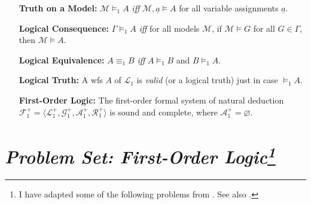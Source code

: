 \documentclass[a4paper, 11pt]{article} %
\newcommand{\tuple}[1]{\langle#1\rangle} %
\newcommand{\M}[0]{\mathcal{M}}
\begin{document}
\begin{enumerate}[leftmargin=1.2in,labelsep=.15in] %
\item[\bf Truth on a Model:] $\M\vDash_1 A$ \textit{iff} $\mathcal{M},\underline{a}\vDash A$ for all variable assignments $\underline{a}$.
\item[\bf Logical Consequence:] $\Gamma\vDash_1 A$ \textit{iff} for all models $\M$, if $\mathcal{M}\vDash G$ for all $G\in\Gamma$, then $\mathcal{M}\vDash A$.
\item[\bf Logical Equivalence:] $A\equiv_1 B$ \textit{iff} $A\vDash_1 B$ and $B\vDash_1 A$.  
\item[\bf Logical Truth:] A wfs $A$ of $\mathcal{L}_1$ is \textit{valid} (or a logical truth) just in case $\vDash_1 A$.
\item[\bf First-Order Logic:] The first-order formal system of natural deduction $\mathcal{F}_1^+=\tuple{\mathcal{L}_1^+,\mathcal{G}_1^+,\mathcal{A}_1^+,\mathcal{R}_1^+}$ is sound and complete, where $\mathcal{A}_1^+=\varnothing$.
\end{enumerate}





\section*{\it Problem Set: First-Order Logic\footnote{I have adapted some of the following problems from \citet{Carr2013}. See also \citet{Halbach2010}.}}
\end{document}
